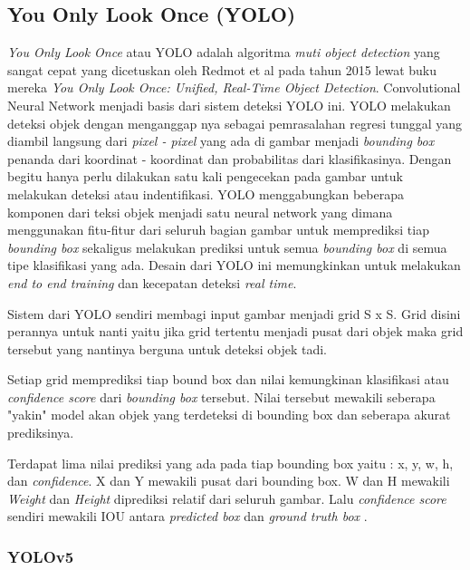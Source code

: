 \subsection{You Only Look Once (YOLO)}
\label{subsec:youonlylookone}

\emph{You Only Look Once} atau YOLO adalah algoritma \emph{muti object detection} yang sangat cepat yang dicetuskan oleh Redmot et al pada tahun 2015
lewat buku mereka \emph{You Only Look Once: Unified, Real-Time Object Detection}\cite{redmon2016you}. Convolutional Neural Network menjadi basis dari sistem deteksi YOLO ini.
YOLO melakukan deteksi objek dengan menganggap nya sebagai pemrasalahan regresi tunggal yang diambil langsung dari \emph{pixel - pixel} yang ada
di gambar menjadi \emph{bounding box} penanda dari koordinat - koordinat dan probabilitas dari klasifikasinya. Dengan begitu
hanya perlu dilakukan satu kali pengecekan pada gambar untuk melakukan deteksi atau indentifikasi. \cite{redmon2016you}
YOLO menggabungkan beberapa komponen dari teksi objek menjadi satu neural network yang dimana menggunakan fitu-fitur
dari seluruh bagian gambar untuk memprediksi tiap \emph{bounding box} sekaligus melakukan prediksi untuk semua
\emph{bounding box} di semua tipe klasifikasi yang ada. Desain dari YOLO ini memungkinkan untuk melakukan
\emph{end to end training} dan kecepatan deteksi \emph{real time}.

\par Sistem dari YOLO sendiri membagi input gambar menjadi grid S x S. Grid disini perannya untuk 
nanti yaitu jika grid tertentu menjadi pusat dari objek maka grid tersebut yang nantinya berguna untuk deteksi objek tadi.

\par Setiap grid memprediksi tiap bound box dan nilai kemungkinan klasifikasi atau \emph{confidence score} dari \emph{bounding box} tersebut.
Nilai tersebut mewakili seberapa "yakin" model akan objek yang terdeteksi di bounding box dan seberapa akurat
prediksinya. 

\par Terdapat lima nilai prediksi yang ada pada tiap bounding box yaitu : x, y, w, h, dan \emph{confidence}.
X dan Y mewakili pusat dari bounding box. W dan H mewakili \emph{Weight} dan \emph{Height} diprediksi relatif
dari seluruh gambar. Lalu \emph{confidence score} sendiri mewakili IOU antara \emph{predicted box} dan \emph{ground truth box} \cite{redmon2016you}.

\subsubsection{YOLOv5}
\label{subsubsec:yolov5}

